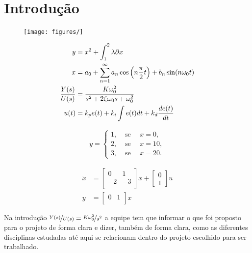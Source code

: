 
\section{Introdução}

\begin{figure}
  \begin{center}
    \texttt{[image: figures/]}
  \end{center}
  \caption{}\label{fig:}
\end{figure}


\begin{align}
    y &= x^{2} +\int_{1}^{2} \lambda \partial x \\
    x &= a_{0} + \sum_{n=1}^{\infty} a_{n} \cos\left(n\frac{\pi}{2} t\right) +b_{n} \sin(n\omega_0 t) \notag \\
    \frac{Y(s)}{U(s)} &= \frac{K\omega_0^2}{s^2 +2\zeta\omega_0 s +\omega_0^2} \\
    u(t) &= k_p e(t) +k_i\int e(t) dt +k_d \frac{de(t)}{dt} \label{eq:one}
\end{align}


\begin{align}
     y=\begin{cases}
 1, & \text{ se }\quad x= 0,\\
 2, & \text{ se }\quad x= 10,\\
 3, & \text{ se }\quad x= 20.
\end{cases}
\end{align}

\begin{align}
    \dot{x} &= \begin{bmatrix}
0 & 1 \\
-2 & -3 \\
\end{bmatrix} x + \begin{bmatrix}
0 \\
1
\end{bmatrix} u \\
y &= \begin{bmatrix}
0 & 1 \\
\end{bmatrix} x
\end{align}





Na introdução $\nicefrac{Y(s)}{U(s)} = \nicefrac{K\omega_0^2}{s^2}$ a equipe tem que informar o que foi proposto para o projeto de forma clara e dizer, também de forma clara, como as diferentes disciplinas estudadas até aqui se relacionam dentro do projeto escolhido para ser trabalhado. 

